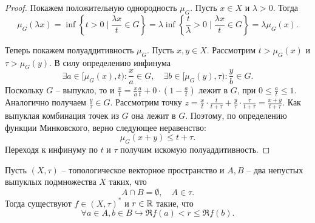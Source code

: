 \begin{proof}
    Покажем положительную однородность $\mu_G$.
    Пусть $x \in X$ и $\lambda > 0$.
    Тогда
    \[
        \mu_G(\lambda x) = \inf \left\{t > 0 \mid \frac{\lambda x}{t} \in G \right\} = \lambda \inf \left\{\frac{t}{\lambda} > 0 \mid \frac{\lambda x}{t} \in G\right\} = \lambda \mu_G(x).
    \]

    Теперь покажем полуаддитивность $\mu_G$.
    Пусть $x, y \in X$.
    Рассмотрим $t > \mu_G(x)$ и $\tau > \mu_G(y)$.
    В силу определению инфинума
    \[
        \exists a \in [\mu_G(x), t)\colon \frac{x}{a} \in G, \quad \exists b \in [\mu_G(y), \tau)\colon \frac{y}{b} \in G.
    \]
    Поскольку $G$ -- выпукло, то и $\frac{x}{t} = \frac{x}{a}\frac{a}{t} + 0 \cdot \left(1 - \frac{a}{t}\right)$ лежит в $G$, при $0 \leq \frac{a}{t} \leq 1$.
    Аналогично получаем $\frac{y}{\tau} \in G$.
    Рассмотрим точку $z = \frac{x}{t}\cdot \frac{t}{t + \tau} + \frac{y}{\tau}\cdot \frac{\tau}{t + \tau} = \frac{x + y}{t + \tau}$.
    Как выпуклая комбинация точек из $G$ она лежит в $G$.
    Поэтому, по определению функции Минковского, верно следующее неравенство:
    \[
        \mu_G(x + y) \leq t + \tau.
    \]
    Переходя к инфинуму по $t$ и $\tau$ получим искомую полуаддитивность.
\end{proof}
\begin{theorem}\label{th:separability_first}
    Пусть $(X, \tau)$ -- топологическое векторное пространство и $A, B$ -- два непустых выпуклых подмножества $X$ таких, что
    \[
        A \cap B = \emptyset, \quad A \in \tau.
    \]
    Тогда существуют $f \in (X, \tau)^*$ и $r \in \mathbb{R}$ такие, что
    \[
        \forall a \in A, b \in B \hookrightarrow \Re f(a) < r \leq \Re f(b).
    \]
\end{theorem}
